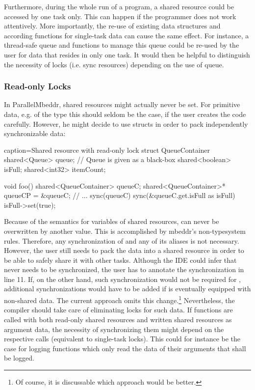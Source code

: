 Furthermore, during the whole run of a program, a shared resource could be accessed by one task only. This can happen if the programmer does not work attentively. More importantly, the re-use of existing data structures and according functions for single-task data can cause the same effect. For instance, a thread-safe queue and functions to manage this queue could be re-used by the user for data that resides in only one task. It would then be helpful to distinguish the necessity of locks (i.e. sync resources) depending on the use of queue.

\subsubsection{Read-only Locks}
In ParallelMbeddr, shared resources might actually never be set. For primitive data, e.g. of the type  this should seldom be the case, if the user creates the code carefully. However, he might decide to use structs in order to pack independently synchronizable data:
\begin{ccode}{caption=Shared resource with read-only lock}
struct QueueContainer {
  shared<Queue>   queue;     // Queue is given as a black-box
  shared<boolean> isFull;
  shared<int32>   itemCount;
}

void foo() {
  shared<QueueContainer> queueC;
  shared<QueueContainer>* queueCP = &queueC;
  // ...
  sync(queueC) {
    sync(&queueC.get.isFull as isFull) { isFull->set(true); }
  }
}
\end{ccode}
Because of the semantics for variables of shared resources,  can never be overwritten by another value. This is accomplished by mbeddr's non-typesystem rules. Therefore, any synchronization of  and any of its aliases is not necessary. However, the user still needs to pack the data into a shared resource in order to be able to safely share it with other tasks. Although the IDE could infer that  never needs to be synchronized, the user has to annotate the synchronization in line 11. If, on the other hand, such synchronization would not be required for , additional synchronizations would have to be added if  is eventually equipped with non-shared data. The current approach omits this change.\footnote{Of course, it is discussable which approach would be better.} Nevertheless, the compiler should take care of eliminating locks for such data. If functions are called with both read-only shared resources and written shared resources as argument data, the necessity of synchronizing them might depend on the respective calls (equivalent to single-task locks). This could for instance be the case for logging functions which only read the data of their arguments that shall be logged.

